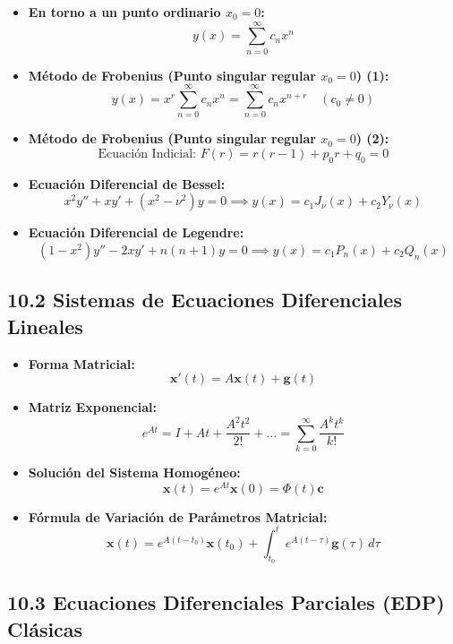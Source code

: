 \documentclass[11pt,a4paper]{article}
\begin{document}
\begin{itemize}
  \item \textbf{En torno a un punto ordinario $x_0 = 0$:}
  \[
    y(x) = \sum_{n=0}^\infty c_n x^n
  \]
  \item \textbf{Método de Frobenius (Punto singular regular $x_0 = 0$) (1):}
  \[
    y(x) = x^r \sum_{n=0}^\infty c_n x^n = \sum_{n=0}^\infty c_n x^{n + r} \quad (c_0 \ne 0)
  \]
  \item \textbf{Método de Frobenius (Punto singular regular $x_0 = 0$) (2):}
  \[
    \text{Ecuación Indicial: } F(r) = r(r - 1) + p_0 r + q_0 = 0
  \]
  \item \textbf{Ecuación Diferencial de Bessel:}
  \[
    x^2 y'' + x y' + (x^2 - \nu^2)y = 0 \implies y(x) = c_1 J_\nu(x) + c_2 Y_\nu(x)
  \]
  \item \textbf{Ecuación Diferencial de Legendre:}
  \[
    (1 - x^2)y'' - 2x y' + n(n + 1)y = 0 \implies y(x) = c_1 P_n(x) + c_2 Q_n(x)
  \]
\end{itemize}

\subsection*{10.2 Sistemas de Ecuaciones Diferenciales Lineales}

\begin{itemize}
  \item \textbf{Forma Matricial:}
  \[
    \mathbf{x}'(t) = A\mathbf{x}(t) + \mathbf{g}(t)
  \]
  \item \textbf{Matriz Exponencial:}
  \[
    e^{At} = I + At + \frac{A^2 t^2}{2!} + \dots = \sum_{k=0}^\infty \frac{A^k t^k}{k!}
  \]
  \item \textbf{Solución del Sistema Homogéneo:}
  \[
    \mathbf{x}(t) = e^{At}\mathbf{x}(0) = \Phi(t)\mathbf{c}
  \]
  \item \textbf{Fórmula de Variación de Parámetros Matricial:}
  \[
    \mathbf{x}(t) = e^{A(t - t_0)}\mathbf{x}(t_0) + \int_{t_0}^t e^{A(t - \tau)}\mathbf{g}(\tau) \, d\tau
  \]
\end{itemize}

\subsection*{10.3 Ecuaciones Diferenciales Parciales (EDP) Clásicas}
\end{document}
